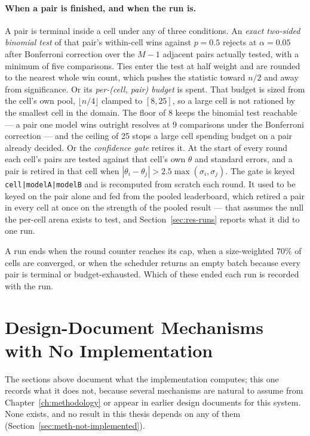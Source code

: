 \paragraph{When a pair is finished, and when the run is.}
A pair is terminal inside a cell under any of three conditions.
An \emph{exact two-sided binomial test} of that pair's within-cell wins
against $p = 0.5$ rejects at $\alpha = 0.05$ after Bonferroni
correction over the $M - 1$ adjacent pairs actually tested, with a
minimum of five comparisons. Ties enter the test at half weight and are
rounded to the nearest whole win count, which pushes the statistic
toward $n/2$ and away from significance.
Or its \emph{per-(cell, pair) budget} is spent. That budget is sized
from the cell's own pool, $\lfloor n/4 \rfloor$ clamped to $[8, 25]$,
so a large cell is not rationed by the smallest cell in the domain. The
floor of 8 keeps the binomial test reachable --- a pair one model wins
outright resolves at 9 comparisons under the Bonferroni correction ---
and the ceiling of 25 stops a large cell spending budget on a pair
already decided.
Or the \emph{confidence gate} retires it. At the start of every round
each cell's pairs are tested against that cell's own $\theta$ and
standard errors, and a pair is retired in that cell when
$|\theta_i - \theta_j| > 2.5\max(\sigma_i, \sigma_j)$. The gate is
keyed \texttt{cell|modelA|modelB} and is recomputed from scratch each
round. It used to be keyed on the pair alone and fed from the pooled
leaderboard, which retired a pair in every cell at once on the strength
of the pooled result --- that assumes the null the per-cell arena
exists to test, and Section~\ref{sec:res-runs} reports what it did to
one run.

A run ends when the round counter reaches its cap, when a size-weighted
$70\%$ of cells are converged, or when the scheduler returns an empty
batch because every pair is terminal or budget-exhausted. Which of
these ended each run is recorded with the run.

\section{Design-Document Mechanisms with No Implementation}\label{app:not-implemented}

The sections above document what the implementation computes; this one records
what it does not, because several mechanisms are natural to assume from
Chapter~\ref{ch:methodology} or appear in earlier design documents for this
system. None exists, and no result in this thesis depends on any of them
(Section~\ref{sec:meth-not-implemented}).

